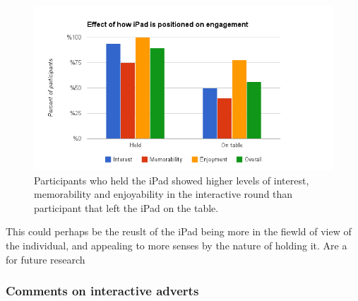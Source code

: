 	\begin{figure}[!ht]
		\centering
		\includegraphics[width=\textwidth]{images/ipad_held.png}
		\caption{Participants who held the iPad showed higher levels of interest, memorability and enjoyability in the interactive round than participant that left the iPad on the table.}
		\label{fig:held}
	\end{figure}

	This could perhaps be the reuslt of the iPad being more in the fiewld of view of the individual, and appealing to more senses by the nature of holding it. Are a for future research
	

	\subsubsection{Comments on interactive adverts}
	